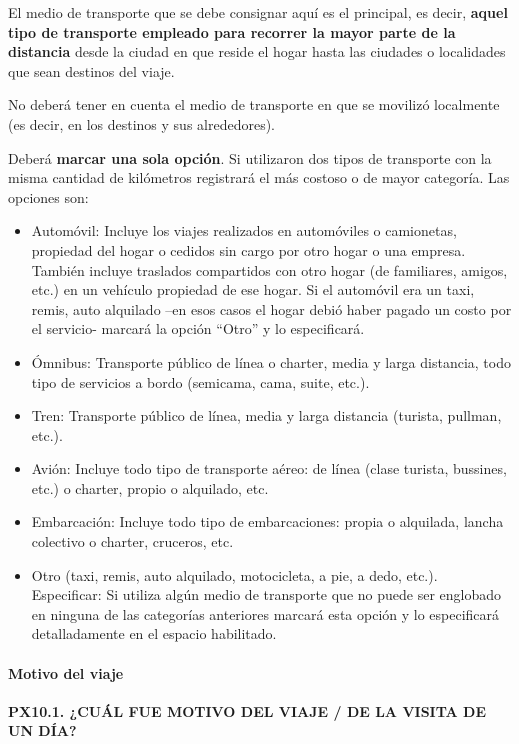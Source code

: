 \documentclass[
  openany]{book}
\begin{document}
El medio de transporte que se debe consignar aquí es el principal, es decir, \textbf{aquel tipo de transporte empleado para recorrer la mayor parte de la distancia} desde la ciudad en que reside el hogar hasta las ciudades o localidades que sean destinos del viaje.

No deberá tener en cuenta el medio de transporte en que se movilizó localmente (es decir, en los destinos y sus alrededores).

Deberá \textbf{marcar una sola opción}. Si utilizaron dos tipos de transporte con la misma cantidad de kilómetros registrará el más costoso o de mayor categoría. Las opciones son:

\begin{itemize}
\item
  Automóvil: Incluye los viajes realizados en automóviles o camionetas, propiedad del hogar o cedidos sin cargo por otro hogar o una empresa. También incluye traslados compartidos con otro hogar (de familiares, amigos, etc.) en un vehículo propiedad de ese hogar. Si el automóvil era un taxi, remis, auto alquilado --en esos casos el hogar debió haber pagado un costo por el servicio- marcará la opción ``Otro'' y lo especificará.
\item
  Ómnibus: Transporte público de línea o charter, media y larga distancia, todo tipo de servicios a bordo (semicama, cama, suite, etc.).
\item
  Tren: Transporte público de línea, media y larga distancia (turista, pullman, etc.).
\item
  Avión: Incluye todo tipo de transporte aéreo: de línea (clase turista, bussines, etc.) o charter, propio o alquilado, etc.
\item
  Embarcación: Incluye todo tipo de embarcaciones: propia o alquilada, lancha colectivo o charter, cruceros, etc.
\item
  Otro (taxi, remis, auto alquilado, motocicleta, a pie, a dedo, etc.). Especificar: Si utiliza algún medio de transporte que no puede ser englobado en ninguna de las categorías anteriores marcará esta opción y lo especificará detalladamente en el espacio habilitado.
\end{itemize}

\hypertarget{motivo-del-viaje}{%
\paragraph{Motivo del viaje}\label{motivo-del-viaje}}

\textbf{PX10.1. ¿CUÁL FUE MOTIVO DEL VIAJE / DE LA VISITA DE UN DÍA?}
\end{document}
